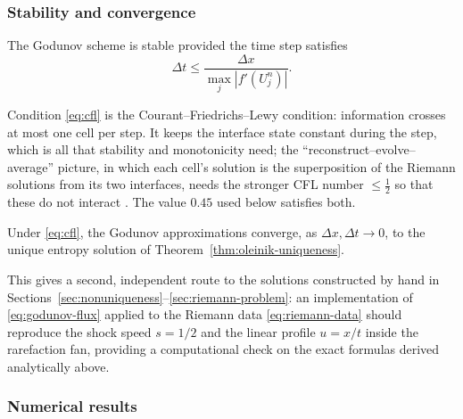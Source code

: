 \subsubsection{Stability and convergence}
\label{subsubsec:godunov-convergence}

\begin{proposition}
\label{prop:cfl}
The Godunov scheme is stable provided the time step satisfies
\begin{equation}
  \label{eq:cfl}
  \Delta t \le \frac{\Delta x}{\max_j |f'(U_j^n)|}.
\end{equation}
\end{proposition}

Condition \eqref{eq:cfl} is the Courant--Friedrichs--Lewy condition:
information crosses at most one cell per step. It keeps the interface state
constant during the step, which is all that stability and monotonicity need;
the ``reconstruct--evolve--average'' picture, in which each cell's solution is
the superposition of the Riemann solutions from its two interfaces, needs the
stronger CFL number $\le\tfrac12$ so that these do not interact
\cite[Ch.~4]{leveque2002}. The value $0.45$ used below satisfies both.

\begin{theorem}
\label{thm:godunov-convergence}
Under \eqref{eq:cfl}, the Godunov approximations converge, as $\Delta x,
\Delta t \to 0$, to the unique entropy solution of
Theorem~\ref{thm:oleinik-uniqueness}.
\end{theorem}

\begin{remark}
\label{rem:godunov-check}
This gives a second, independent route to the solutions constructed by
hand in Sections~\ref{sec:nonuniqueness}--\ref{sec:riemann-problem}: an
implementation of \eqref{eq:godunov-flux} applied to the Riemann data
\eqref{eq:riemann-data} should reproduce the shock speed $s=1/2$ and the
linear profile $u=x/t$ inside the rarefaction fan, providing a
computational check on the exact formulas derived analytically above.
\end{remark}

\subsubsection{Numerical results}
\label{subsubsec:godunov-results}

